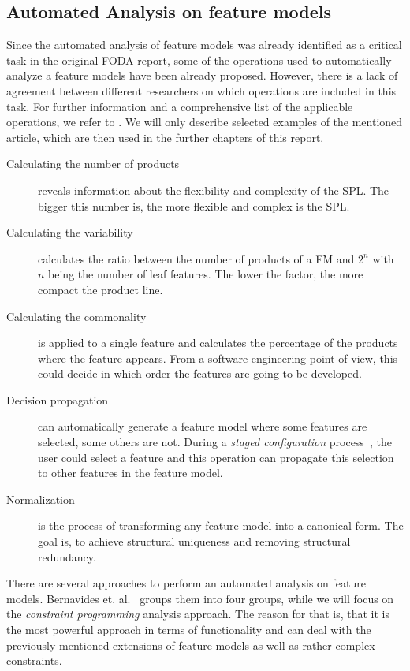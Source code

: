 \subsection{Automated Analysis on feature models}\label{subsec:automated-analysis}

Since the automated analysis of feature models was already identified as a critical task in the original FODA report, some of the operations used to automatically analyze a feature models have been already proposed. However, there is a lack of agreement between different researchers on which operations are included in this task. For further information and a comprehensive list of the applicable operations, we refer to \cite{feature-model-survey}. We will only describe selected examples of the mentioned article, which are then used in the further chapters of this report.

\begin{description}
 \item[Calculating the number of products] reveals information about the flexibility and complexity of the SPL. The bigger this number is, the more flexible and complex is the SPL.
 
 \item[Calculating the variability] calculates the ratio between the number of products of a FM and $2^n$ with $n$ being the number of leaf features. The lower the factor, the more compact the product line.
 
 \item[Calculating the commonality] is applied to a single feature and calculates the percentage of the products where the feature appears. From a software engineering point of view, this could decide in which order the features are going to be developed. 
 
 \item[Decision propagation] can automatically generate a feature model where some features are selected, some others are not. During a \emph{staged configuration} process~\cite{card-based-feature-models-formalization}, the user could select a feature and this operation can propagate this selection to other features in the feature model.
 
 \item[Normalization] is the process of transforming any feature model into a canonical form. The goal is, to achieve structural uniqueness and removing structural redundancy. 
\end{description}

There are several approaches to perform an automated analysis on feature models. Bernavides et. al.~\cite{feature-model-survey} groups them into four groups, while we will focus on the \emph{constraint programming} analysis approach. The reason for that is, that it is the most powerful approach in terms of functionality and can deal with the previously mentioned extensions of feature models as well as rather complex constraints. 


